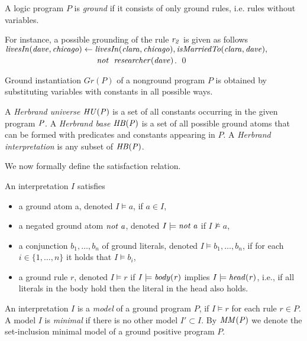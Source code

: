 A logic program $P$ is \emph{ground} if it consists of only ground rules, i.e. rules without
variables. 

\begin{example}
For instance, a possible grounding of the rule $\mathit{r_2}$ is given as follows $\mathit{livesIn(dave,chicago)\leftarrow livesIn(clara,chicago),isMarriedTo(clara,dave),}$\\$
\phantom{livesIn(dave,chicago)\leftarrow}\mathit{not}~ \mathit{\;researcher(dave)}$. \qed
\end{example}

Ground instantiation $Gr(P)$ of a nonground program $P$ is obtained by substituting variables with constants in all possible ways. 


\begin{definition}
A \emph{Herbrand universe}  $\mathit{HU(P)}$ is a set of all constants occurring in the given program $\mathit{P}$. A \emph{Herbrand base}  $\mathit{HB(P)}$ is a set of all possible ground atoms that can be formed with predicates and constants appearing in $P$. A \emph{Herbrand interpretation} is any subset of $\mathit{HB(P)}$.
\end{definition}

We now formally define the satisfaction relation. 

\begin{definition} An interpretation $I$ satisfies
\begin{itemize}
\item a ground atom a, denoted $I \models a$, if $a \in I$,
\item a negated ground atom $\mathit{not\; a}$, denoted $I \models \mathit{not\; a}$ if $I \not \models a$,
\item  a conjunction $b_1,\dotsc,b_n$ of ground literals, denoted $I \models b_1,\dotsc,b_n$, if for
each $i\in \{1,\dotsc, n\}$ it holds that $I \models b_i$,
\item a ground rule $r$, denoted $I \models r$ if $I \models \mathit{body(r)}$ implies $I \models \mathit{head(r)}$, i.e., if all literals in the body hold then the literal in the head also holds.
\end{itemize}
\end{definition}

An interpretation $I$ is a \emph{model} of a ground program $P$, if $I \models r$ for each rule
$r \in P$. A model $I$ is \emph{minimal} if there is no other model $I' \subset I$.
By $\mathit{MM(P)}$ we denote the set-inclusion minimal model of a ground positive program $P$.

